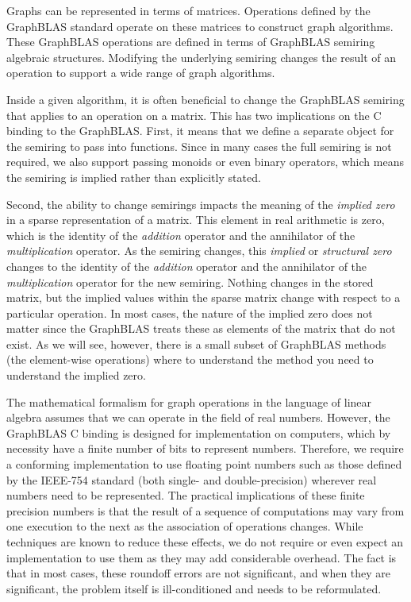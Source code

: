 Graphs can be represented in terms of matrices. Operations defined by the GraphBLAS standard
operate on these matrices to construct graph algorithms.
These GraphBLAS operations are defined in terms of GraphBLAS semiring algebraic 
structures. Modifying the underlying semiring changes the result of 
an operation to support a wide range of graph algorithms.

Inside a given algorithm, it is often beneficial to change the GraphBLAS semiring
that applies to an operation on a matrix.  This has two 
implications on the C binding to the GraphBLAS.  First,
it means that we define a separate object for the semiring 
to pass into functions.  Since in many cases the full
semiring is not required, we also support passing monoids or
even binary operators, which means the semiring is implied rather than 
explicitly stated.

Second, the ability to change semirings impacts the meaning of 
the \emph{implied zero} in a sparse representation of a matrix.
This element in real arithmetic is zero, which is the 
identity of the \emph{addition} operator and the annihilator of the
\emph{multiplication} operator.   As the semiring changes, this 
\emph{implied} or \emph{structural zero} changes to the identity of 
the \emph{addition} operator and the annihilator of the \emph{multiplication} 
operator for the new semiring.   Nothing changes in the
stored matrix, but the implied values within the sparse matrix change
with respect to a particular operation.  In most cases, the nature
of the implied zero does not matter since the GraphBLAS treats these
as elements of the matrix that do not exist.  As we will see, however,
there is a small subset of GraphBLAS methods 
(the element-wise operations) where to understand 
the method you need to understand the implied zero.

The mathematical formalism for graph operations in the language of 
linear algebra assumes that we can operate in the field of real numbers. 
However, the GraphBLAS C binding is designed for implementation on computers, 
which by necessity have a finite number of bits to represent numbers. 
Therefore, we require a conforming implementation to use floating point 
numbers such as those defined by the IEEE-754 standard (both single- and double-precision) 
wherever real numbers need to be represented. The practical implications of 
these finite precision numbers is that the result of a sequence of 
computations may vary from one execution to the next as the association 
of operations changes.  While techniques are known to 
reduce these effects, we do not require or even expect an implementation 
to use them as they may add considerable overhead. The fact is that in most 
cases, these roundoff errors are not significant, and when they are significant, 
the problem itself is ill-conditioned and needs to be reformulated.

